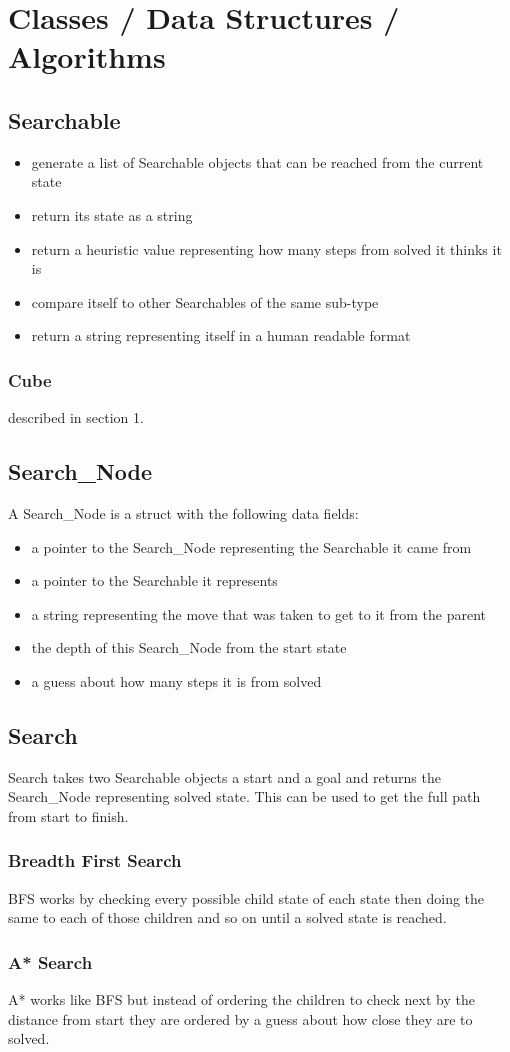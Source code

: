 \documentclass{article}
\begin{document}
\section{Classes / Data Structures / Algorithms}
\subsection{Searchable}
\begin{itemize}
\item generate a list of Searchable objects that can be reached from the current state
\item return its state as a string
\item return a heuristic value representing how many steps from solved it thinks it is
\item compare itself to other Searchables of the same sub-type
\item return a string representing itself in a human readable format
\end{itemize}
\subsubsection{Cube}
described in section 1.

\subsection{Search\_Node}
A Search\_Node is a struct with the following data fields:
\begin{itemize}
\item a pointer to the Search\_Node representing the Searchable it came from
\item a pointer to the Searchable it represents
\item a string representing the move that was taken to get to it from the parent
\item the depth of this Search\_Node from the start state
\item a guess about how many steps it is from solved
\end{itemize}

\subsection{Search}
Search takes two Searchable objects a start and a goal and returns the Search\_Node representing solved state. This can be used to get the full
path from start to finish.
\subsubsection{Breadth First Search}
BFS works by checking every possible child state of each state then doing the same to each of those children and so on until a solved state is
reached.
\subsubsection{A* Search}
A* works like BFS but instead of ordering the children to check next by the distance from start they are ordered by a guess about how close
they are to solved.
\end{document}
